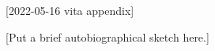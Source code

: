 [2022-05-16 vita appendix]

\begin{vita}
\index{\verb+\begin{vita}+}
  
[Put a brief autobiographical sketch here.]

\end{vita}
